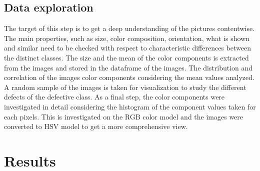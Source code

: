\documentclass[10pt, final]{article}
\begin{document}
		\subsection{Data exploration}
			The target of this step is to get a deep understanding of the pictures contentwise.
			The main properties, such as size, color composition, orientation, what is shown and similar need to be 
			checked with respect to characteristic differences between the distinct classes.
			The size and the mean of the color components is extracted from the images and stored in the dataframe 
			of the images.
			The distribution and correlation of the images color components considering the mean values analyzed.
			A random sample of the images is taken for visualization to study the different defects of the defective class.
			As a final step, the color components were investigated in detail considering the histogram of the component
			values taken for each pixels.
			This is investigated on the RGB color model and the images were converted to HSV model to get a more
			comprehensive view.
	
	\section{Results} \label{sec:results}
\end{document}
